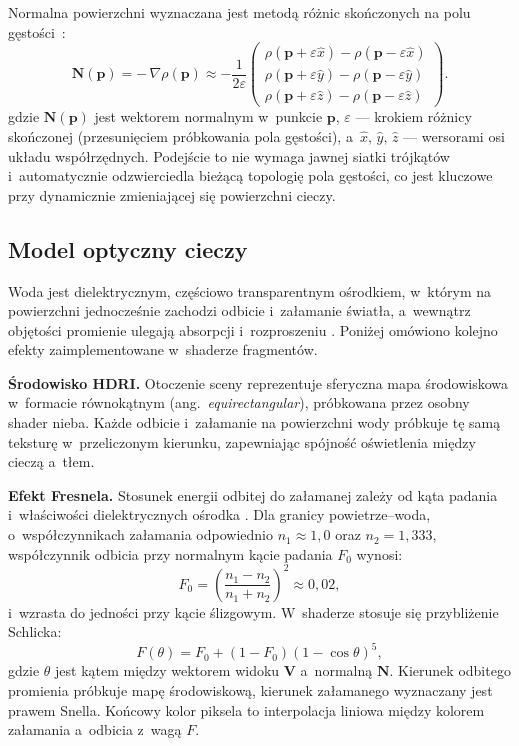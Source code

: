 Normalna powierzchni wyznaczana jest metodą różnic skończonych na polu gęstości~\cite{tomczak2012gpu}:
\begin{equation}
    \mathbf{N}(\mathbf{p}) = -\,\nabla\rho(\mathbf{p}) \approx -\frac{1}{2\varepsilon}
    \begin{pmatrix}
        \rho(\mathbf{p}+\varepsilon\hat{x}) - \rho(\mathbf{p}-\varepsilon\hat{x}) \\[2pt]
        \rho(\mathbf{p}+\varepsilon\hat{y}) - \rho(\mathbf{p}-\varepsilon\hat{y}) \\[2pt]
        \rho(\mathbf{p}+\varepsilon\hat{z}) - \rho(\mathbf{p}-\varepsilon\hat{z})
    \end{pmatrix}.
\end{equation}
gdzie $\mathbf{N}(\mathbf{p})$ jest wektorem normalnym w~punkcie $\mathbf{p}$, $\varepsilon$ --- krokiem różnicy skończonej (przesunięciem próbkowania pola gęstości), a~$\hat{x},\,\hat{y},\,\hat{z}$ --- wersorami osi układu współrzędnych.
Podejście to nie wymaga jawnej siatki trójkątów i~automatycznie odzwierciedla
bieżącą topologię pola gęstości, co jest kluczowe przy dynamicznie zmieniającej
się powierzchni cieczy.

\subsection{Model optyczny cieczy}

Woda jest dielektrycznym, częściowo transparentnym ośrodkiem, w~którym na powierzchni
jednocześnie zachodzi odbicie i~załamanie światła, a~wewnątrz objętości promienie
ulegają absorpcji i~rozproszeniu \cite{pharr2016physically}. Poniżej omówiono kolejno
efekty zaimplementowane w~shaderze fragmentów.

\textbf{Środowisko HDRI.} Otoczenie sceny reprezentuje sferyczna mapa środowiskowa
w~formacie równokątnym (ang.~\textit{equirectangular}), próbkowana przez osobny shader
nieba. Każde odbicie i~załamanie na powierzchni wody próbkuje tę samą teksturę
w~przeliczonym kierunku, zapewniając spójność oświetlenia między cieczą a~tłem.

\textbf{Efekt Fresnela.} Stosunek energii odbitej do załamanej zależy od kąta
padania i~właściwości dielektrycznych ośrodka \cite{de2006reflections}. Dla granicy powietrze--woda,
o~współczynnikach załamania odpowiednio $n_1 \approx 1{,}0$ oraz $n_2 = 1{,}333$, współczynnik odbicia przy normalnym kącie padania $F_0$ wynosi:
\begin{equation}
    F_0 = \left(\frac{n_1 - n_2}{n_1 + n_2}\right)^{\!2} \approx 0{,}02,
    \label{eq:fresnel_f0}
\end{equation}
i~wzrasta do jedności przy kącie ślizgowym. W~shaderze stosuje się przybliżenie
Schlicka:
\begin{equation}
    F(\theta) = F_0 + (1 - F_0)(1 - \cos\theta)^5,
\end{equation}
gdzie $\theta$ jest kątem między wektorem widoku $\mathbf{V}$ a~normalną $\mathbf{N}$.
Kierunek odbitego promienia próbkuje mapę środowiskową, kierunek załamanego wyznaczany jest
prawem Snella. Końcowy kolor piksela to interpolacja liniowa między kolorem
załamania a~odbicia z~wagą $F$.

